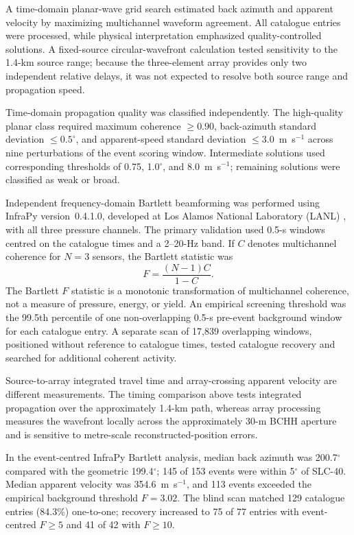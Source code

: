 \documentclass[]{seismica}
\begin{document}
A time-domain planar-wave grid search estimated back azimuth and apparent
velocity by maximizing multichannel waveform agreement. All catalogue entries
were processed, while physical interpretation emphasized quality-controlled
solutions. A fixed-source circular-wavefront calculation tested sensitivity to
the 1.4-km source range; because the three-element array provides only two
independent relative delays, it was not expected to resolve both source range
and propagation speed.

Time-domain propagation quality was classified independently. The high-quality
planar class required maximum coherence $\geq0.90$, back-azimuth standard
deviation $\leq0.5^\circ$, and apparent-speed standard deviation
$\leq3.0$~m~s$^{-1}$ across nine perturbations of the event scoring window.
Intermediate solutions used corresponding thresholds of 0.75, 1.0$^\circ$,
and 8.0~m~s$^{-1}$; remaining solutions were classified as weak or broad.

Independent frequency-domain Bartlett beamforming was performed using InfraPy
version~0.4.1.0, developed at Los Alamos National Laboratory (LANL)
\citep{webster_infrapy_2025}, with all three pressure channels. The primary
validation used 0.5-s windows centred on the catalogue times and a 2--20-Hz
band. If $C$ denotes multichannel coherence for $N=3$ sensors, the Bartlett
statistic was
\begin{equation}
 F=\frac{(N-1)C}{1-C}.
\end{equation}
The Bartlett $F$ statistic is a monotonic transformation of multichannel coherence,
not a measure of pressure, energy, or yield. An empirical screening threshold
was the 99.5th percentile of one non-overlapping 0.5-s pre-event background
window for each catalogue entry. A separate scan of 17,839 overlapping windows,
positioned without reference to catalogue times, tested catalogue recovery and
searched for additional coherent activity.

Source-to-array integrated travel time and array-crossing apparent velocity are
different measurements. The timing comparison above tests integrated
propagation over the approximately 1.4-km path, whereas array processing
measures the wavefront locally across the approximately 30-m BCHH aperture and
is sensitive to metre-scale reconstructed-position errors.

In the event-centred InfraPy Bartlett analysis, median back azimuth was
200.7$^\circ$ compared with the geometric 199.4$^\circ$; 145 of 153 events
were within 5$^\circ$ of SLC-40. Median apparent velocity was
354.6~m~s$^{-1}$, and 113 events exceeded the empirical background threshold
$F=3.02$. The blind scan matched 129 catalogue entries (84.3\%) one-to-one;
recovery increased to 75 of 77 entries with event-centred $F\geq5$ and 41 of
42 with $F\geq10$.
\end{document}
